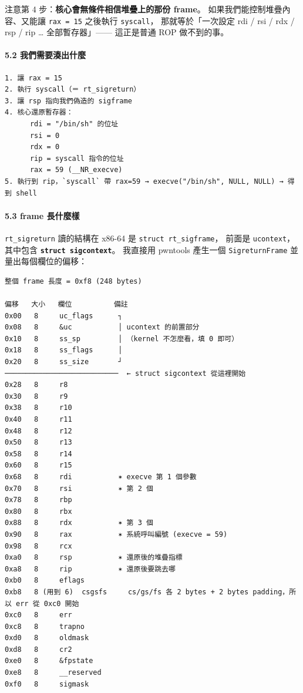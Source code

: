 \documentclass[10pt,a4paper]{article}
\begin{document}
注意第 4 步：\textbf{核心會無條件相信堆疊上的那份 frame}。
如果我們能控制堆疊內容、又能讓 \texttt{rax\ \allowbreak{}=\ \allowbreak{}15} 之後執行
\texttt{syscall}， 那就等於「一次設定 rdi / rsi / rdx / rsp / rip
\ldots{} 全部暫存器」------ 這正是普通 ROP 做不到的事。

\paragraph{5.2
我們需要湊出什麼}\label{ux6211ux5011ux9700ux8981ux6e4aux51faux4ec0ux9ebc}

\begin{Verbatim}[breaklines=true,breakanywhere=true,breakautoindent=false,fontsize=\fontsize{7.0}{9.5}\selectfont]
1. 讓 rax = 15
2. 執行 syscall（＝ rt_sigreturn）
3. 讓 rsp 指向我們偽造的 sigframe
4. 核心還原暫存器：
      rdi = "/bin/sh" 的位址
      rsi = 0
      rdx = 0
      rip = syscall 指令的位址
      rax = 59 (__NR_execve)
5. 執行到 rip，`syscall` 帶 rax=59 → execve("/bin/sh", NULL, NULL) → 得到 shell
\end{Verbatim}

\paragraph{5.3 frame 長什麼樣}\label{frame-ux9577ux4ec0ux9ebcux6a23}

\texttt{rt\_\allowbreak{}sigreturn} 讀的結構在 x86-64 是
\texttt{struct\ \allowbreak{}rt\_\allowbreak{}sigframe}， 前面是 \texttt{ucontext}，其中包含
\textbf{\texttt{struct\ \allowbreak{}sigcontext}}。 我直接用 pwntools 產生一個
\texttt{SigreturnFrame} 並量出每個欄位的偏移：

\begin{Verbatim}[breaklines=true,breakanywhere=true,breakautoindent=false,fontsize=\fontsize{7.0}{9.5}\selectfont]
整個 frame 長度 = 0xf8 (248 bytes)

偏移   大小   欄位          備註
0x00   8     uc_flags      ┐
0x08   8     &uc           │ ucontext 的前置部分
0x10   8     ss_sp         │ （kernel 不怎麼看，填 0 即可）
0x18   8     ss_flags      │
0x20   8     ss_size       ┘
───────────────────────────  ← struct sigcontext 從這裡開始
0x28   8     r8
0x30   8     r9
0x38   8     r10
0x40   8     r11
0x48   8     r12
0x50   8     r13
0x58   8     r14
0x60   8     r15
0x68   8     rdi           ✶ execve 第 1 個參數
0x70   8     rsi           ✶ 第 2 個
0x78   8     rbp
0x80   8     rbx
0x88   8     rdx           ✶ 第 3 個
0x90   8     rax           ✶ 系統呼叫編號 (execve = 59)
0x98   8     rcx
0xa0   8     rsp           ✶ 還原後的堆疊指標
0xa8   8     rip           ✶ 還原後要跳去哪
0xb0   8     eflags
0xb8   8 (用到 6)  csgsfs     cs/gs/fs 各 2 bytes + 2 bytes padding，所以 err 從 0xc0 開始
0xc0   8     err
0xc8   8     trapno
0xd0   8     oldmask
0xd8   8     cr2
0xe0   8     &fpstate
0xe8   8     __reserved
0xf0   8     sigmask
\end{Verbatim}
\end{document}
